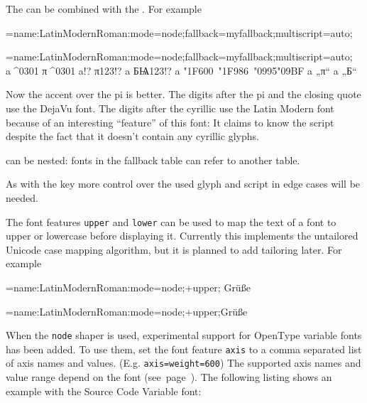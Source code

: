    The  can be combined with the . For example

   \beginlisting
   \font\test={name:LatinModernRoman:mode=node;fallback=myfallback;multiscript=auto;}
   \endlisting

   {\Large
    \font\test={name:LatinModernRoman:mode=node;fallback=myfallback;multiscript=auto;} a^^^^0301 π^^^^0301 a!? π123!? a БѨ123!? a \char"1F600\ \char"1F986\ \char"0995\char"09BF a „π“ a „Б“
   }

   Now the accent over the pi is better. The digits after the pi and the closing quote use the DejaVu font. The digits after
   the cyrillic use the Latin Modern font because of an interesting \enquote{feature} of this font: It claims to know the  script despite the fact that it doesn't contain any cyrillic glyphs.

    can be nested: fonts in the fallback table can refer to another  table.

   As with the  key more control over the used glyph and script in edge cases will be needed.
   \endaltitem

   The\label{upperlower}
   font features \texttt{upper} and \texttt{lower} can be used to map
   the text of a font to upper or lowercase before displaying it. Currently
   this implements the untailored Unicode case mapping algorithm, but it is
   planned to add tailoring later. For example

   \beginlisting
   \font\test={name:LatinModernRoman:mode=node;+upper;}
   \test Grüße
   \endlisting

   {\Large\font\test={name:LatinModernRoman:mode=node;+upper;}\test Grüße}

  \endaltitem

   When\label{variablefonts}
   the \texttt{node} shaper is used,
   experimental support for OpenType variable
   fonts has been added. To use them, set the font feature \texttt{axis} to
   a comma separated list of axis names and values. (E.g.  \texttt{axis={weight=600}})
   The supported axis names and value range depend on the font (see~page~\pageref{variablefonts}).
   The following listing shows an example with the Source Code Variable font:

